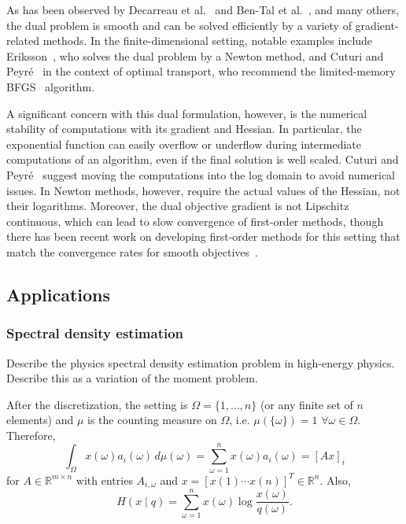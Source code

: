 \documentclass[10pt,a4paper]{article}
\numberwithin{equation}{section}
\theoremstyle{definition}
\def\rr{{\mathbb R}}
\begin{document}
As has been observed by Decarreau et al.~\cite{decarreau_DualMethodsEntropy_1992} and Ben-Tal et al.~\cite{ben-tal_RoleDualityOptimization_1988}, and many others, the dual problem is smooth and can be solved efficiently by a variety of gradient-related methods. In the finite-dimensional setting, notable examples include Eriksson~\cite{eriksson_NoteSolutionLarge_1980}, who solves the dual problem by a Newton method, and Cuturi and Peyr\'e~\cite{cuturi_SemidualRegularizedOptimal_2018} in the context of optimal transport, who recommend the limited-memory BFGS~\cite{liu_LimitedMemoryBFGS_1989} algorithm.

A significant concern with this dual formulation, however, is the numerical stability of computations with its gradient and Hessian. In particular, the exponential function can easily overflow or underflow during intermediate computations of an algorithm, even if the final solution is well scaled. Cuturi and Peyr\'e~\cite{cuturi_SemidualRegularizedOptimal_2018} suggest moving the computations into the log domain to avoid numerical issues. In Newton methods, however, require the actual values of the Hessian, not their logarithms. Moreover, the dual objective gradient is not Lipschitz continuous, which can lead to slow convergence of first-order methods, though there has been recent work on developing first-order methods for this setting that match the convergence rates for smooth objectives~\cite{luAcceleratedFirstorderMethods2023,malitskyAdaptiveGradientDescent2020}.

\subsection{Applications}

\subsubsection{Spectral density estimation}

Describe the physics spectral density estimation problem in high-energy physics. Describe this as a variation of the moment problem. 

After the discretization, the setting is $\Omega = \{1, \dots, n\}$ (or any finite set of $n$ elements) and $\mu$ is the counting measure on $\Omega$, i.e. $\mu(\{\omega\}) = 1$ $\forall \omega \in \Omega$. Therefore,
\[
\int_\Omega x(\omega)a_i(\omega)\,d\mu(\omega) = \sum_{\omega = 1}^n x(\omega) a_i(\omega) = [Ax]_i
\]
for $A \in \rr^{m \times n}$ with entries $A_{i, \omega}$ and $x = [x(1) \cdots x(n)]^T \in \rr^{n}$. Also,
\[
 H(x \mid q) = \sum_{\omega = 1}^n x(\omega) \log \frac{x(\omega)}{q(\omega)}.
\]
\end{document}
